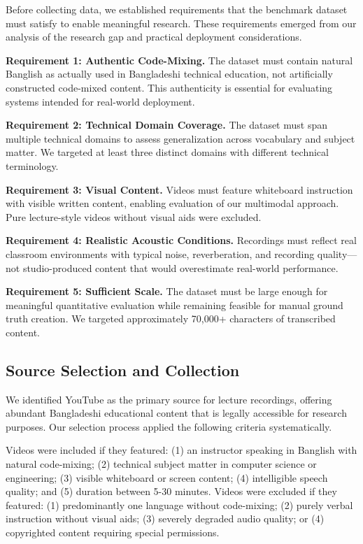 Before collecting data, we established requirements that the benchmark dataset must satisfy to enable meaningful research. These requirements emerged from our analysis of the research gap and practical deployment considerations.

\textbf{Requirement 1: Authentic Code-Mixing.} The dataset must contain natural Banglish as actually used in Bangladeshi technical education, not artificially constructed code-mixed content. This authenticity is essential for evaluating systems intended for real-world deployment.

\textbf{Requirement 2: Technical Domain Coverage.} The dataset must span multiple technical domains to assess generalization across vocabulary and subject matter. We targeted at least three distinct domains with different technical terminology.

\textbf{Requirement 3: Visual Content.} Videos must feature whiteboard instruction with visible written content, enabling evaluation of our multimodal approach. Pure lecture-style videos without visual aids were excluded.

\textbf{Requirement 4: Realistic Acoustic Conditions.} Recordings must reflect real classroom environments with typical noise, reverberation, and recording quality---not studio-produced content that would overestimate real-world performance.

\textbf{Requirement 5: Sufficient Scale.} The dataset must be large enough for meaningful quantitative evaluation while remaining feasible for manual ground truth creation. We targeted approximately 70,000+ characters of transcribed content.

\subsection{Source Selection and Collection}

We identified YouTube as the primary source for lecture recordings, offering abundant Bangladeshi educational content that is legally accessible for research purposes. Our selection process applied the following criteria systematically.

Videos were included if they featured: (1) an instructor speaking in Banglish with natural code-mixing; (2) technical subject matter in computer science or engineering; (3) visible whiteboard or screen content; (4) intelligible speech quality; and (5) duration between 5-30 minutes. Videos were excluded if they featured: (1) predominantly one language without code-mixing; (2) purely verbal instruction without visual aids; (3) severely degraded audio quality; or (4) copyrighted content requiring special permissions.

